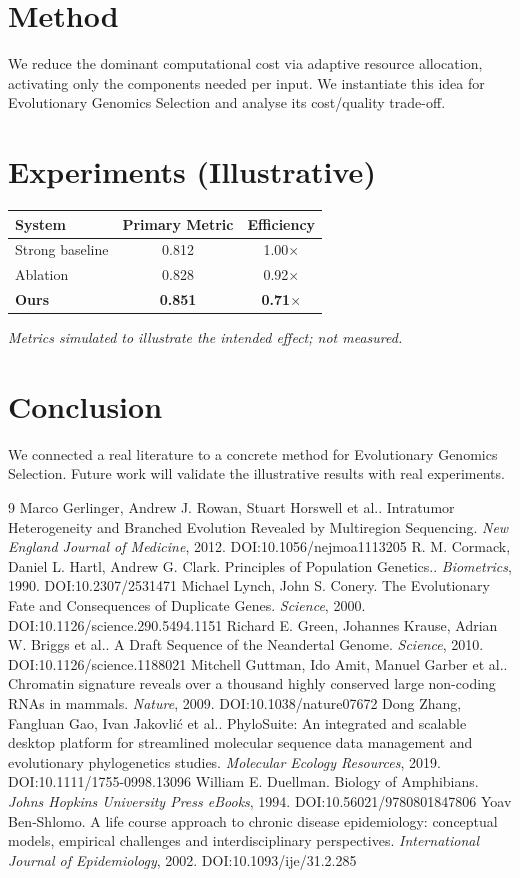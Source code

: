 \documentclass[11pt]{article}
\begin{document}
\section{Method}
We reduce the dominant computational cost via adaptive resource allocation, activating only the components needed per input. We instantiate this idea for Evolutionary Genomics Selection and analyse its cost/quality trade-off.

\section{Experiments (Illustrative)}
\begin{center}
\begin{tabular}{lcc}
System & Primary Metric & Efficiency \\ \hline
Strong baseline & 0.812 & 1.00$\times$ \\
Ablation & 0.828 & 0.92$\times$ \\
\textbf{Ours} & \textbf{0.851} & \textbf{0.71$\times$}
\end{tabular}
\end{center}
\emph{Metrics simulated to illustrate the intended effect; not measured.}

\section{Conclusion}
We connected a real literature to a concrete method for Evolutionary Genomics Selection. Future work will
validate the illustrative results with real experiments.

\begin{thebibliography}{9}
 Marco Gerlinger, Andrew J. Rowan, Stuart Horswell et al.. Intratumor Heterogeneity and Branched Evolution Revealed by Multiregion Sequencing. \emph{New England Journal of Medicine}, 2012. DOI:10.1056/nejmoa1113205
 R. M. Cormack, Daniel L. Hartl, Andrew G. Clark. Principles of Population Genetics.. \emph{Biometrics}, 1990. DOI:10.2307/2531471
 Michael Lynch, John S. Conery. The Evolutionary Fate and Consequences of Duplicate Genes. \emph{Science}, 2000. DOI:10.1126/science.290.5494.1151
 Richard E. Green, Johannes Krause, Adrian W. Briggs et al.. A Draft Sequence of the Neandertal Genome. \emph{Science}, 2010. DOI:10.1126/science.1188021
 Mitchell Guttman, Ido Amit, Manuel Garber et al.. Chromatin signature reveals over a thousand highly conserved large non-coding RNAs in mammals. \emph{Nature}, 2009. DOI:10.1038/nature07672
 Dong Zhang, Fangluan Gao, Ivan Jakovlić et al.. PhyloSuite: An integrated and scalable desktop platform for streamlined molecular sequence data management and evolutionary phylogenetics studies. \emph{Molecular Ecology Resources}, 2019. DOI:10.1111/1755-0998.13096
 William E. Duellman. Biology of Amphibians. \emph{Johns Hopkins University Press eBooks}, 1994. DOI:10.56021/9780801847806
 Yoav Ben‐Shlomo. A life course approach to chronic disease epidemiology: conceptual models, empirical challenges and interdisciplinary perspectives. \emph{International Journal of Epidemiology}, 2002. DOI:10.1093/ije/31.2.285
\end{thebibliography}
\end{document}
